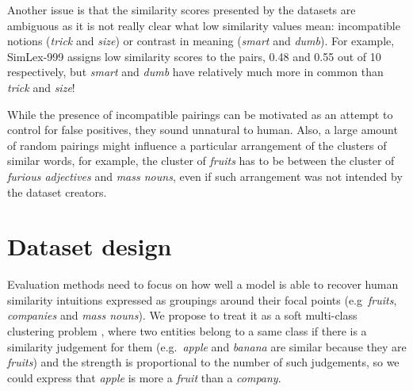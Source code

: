 \documentclass[11pt]{article}
\begin{document}
Another issue is that the similarity scores presented by the datasets are ambiguous as it is not really clear what low similarity values mean: incompatible notions (\textit{trick} and \textit{size}) or contrast in meaning (\textit{smart} and \textit{dumb}). For example, SimLex-999 assigns low similarity scores to the pairs, 0.48 and 0.55 out of 10 respectively, but \textit{smart} and \textit{dumb} have relatively much more in common than \textit{trick} and \textit{size}!

While the presence of incompatible pairings can be motivated as an attempt to control for false positives, they sound unnatural to human. Also, a large amount of random pairings\footnotemark{} might influence a particular arrangement of the clusters of similar words, for example, the cluster of \textit{fruits} has to be between the cluster of \textit{furious adjectives} and \textit{mass nouns}, even if such arrangement was not intended by the dataset creators.

\section{Dataset design}

%

Evaluation methods need to focus on how well a model is able to recover human similarity intuitions expressed as groupings around their focal points (e.g~\textit{fruits}, \textit{companies} and \textit{mass nouns}). We propose to treat it as a soft multi-class clustering problem \cite{White:2015:WSE:2838931.2838932}, where two entities belong to a same class if there is a similarity judgement for them (e.g.~\textit{apple} and \textit{banana} are similar because they are \textit{fruits}) and the strength is proportional to the number of such judgements, so we could express that \textit{apple} is more a \textit{fruit} than a \textit{company}.
\end{document}
